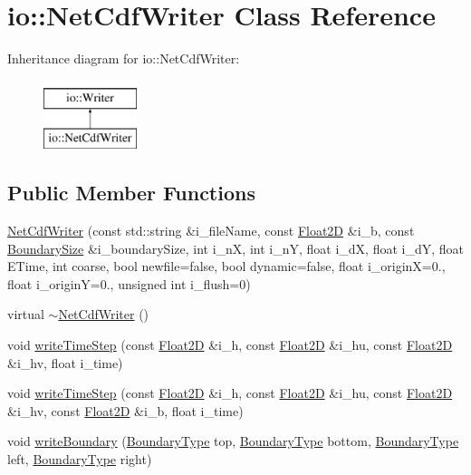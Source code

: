 \hypertarget{classio_1_1NetCdfWriter}{\section{io\-:\-:Net\-Cdf\-Writer Class Reference}
\label{classio_1_1NetCdfWriter}
}
Inheritance diagram for io\-:\-:Net\-Cdf\-Writer\-:\begin{figure}[H]
\begin{center}
\leavevmode
\includegraphics[height=2.000000cm]{classio_1_1NetCdfWriter}
\end{center}
\end{figure}
\subsection*{Public Member Functions}
\begin{DoxyCompactItemize}
\item 
\hyperlink{classio_1_1NetCdfWriter_ae501eb8f2852c5fc4517b36b9b27007c}{Net\-Cdf\-Writer} (const std\-::string \&i\-\_\-file\-Name, const \hyperlink{classFloat2D}{Float2\-D} \&i\-\_\-b, const \hyperlink{structio_1_1BoundarySize}{Boundary\-Size} \&i\-\_\-boundary\-Size, int i\-\_\-n\-X, int i\-\_\-n\-Y, float i\-\_\-d\-X, float i\-\_\-d\-Y, float E\-Time, int coarse, bool newfile=false, bool dynamic=false, float i\-\_\-origin\-X=0., float i\-\_\-origin\-Y=0., unsigned int i\-\_\-flush=0)
\item 
virtual \hyperlink{classio_1_1NetCdfWriter_ace10f1b56bbb4a1b6c2092ed661a1a0d}{$\sim$\-Net\-Cdf\-Writer} ()
\item 
void \hyperlink{classio_1_1NetCdfWriter_a8e49f21f16b1720a348de50485754b0c}{write\-Time\-Step} (const \hyperlink{classFloat2D}{Float2\-D} \&i\-\_\-h, const \hyperlink{classFloat2D}{Float2\-D} \&i\-\_\-hu, const \hyperlink{classFloat2D}{Float2\-D} \&i\-\_\-hv, float i\-\_\-time)
\item 
void \hyperlink{classio_1_1NetCdfWriter_a35a2e5df658e7e95afd3acea193b22a4}{write\-Time\-Step} (const \hyperlink{classFloat2D}{Float2\-D} \&i\-\_\-h, const \hyperlink{classFloat2D}{Float2\-D} \&i\-\_\-hu, const \hyperlink{classFloat2D}{Float2\-D} \&i\-\_\-hv, const \hyperlink{classFloat2D}{Float2\-D} \&i\-\_\-b, float i\-\_\-time)
\item 
void \hyperlink{classio_1_1NetCdfWriter_a27a9b320ecaedb6083f27774fe6be384}{write\-Boundary} (\hyperlink{SWE__Scenario_8hh_af75d5dd7322fa39ed0af4e7839e600f8}{Boundary\-Type} top, \hyperlink{SWE__Scenario_8hh_af75d5dd7322fa39ed0af4e7839e600f8}{Boundary\-Type} bottom, \hyperlink{SWE__Scenario_8hh_af75d5dd7322fa39ed0af4e7839e600f8}{Boundary\-Type} left, \hyperlink{SWE__Scenario_8hh_af75d5dd7322fa39ed0af4e7839e600f8}{Boundary\-Type} right)
\end{DoxyCompactItemize}
